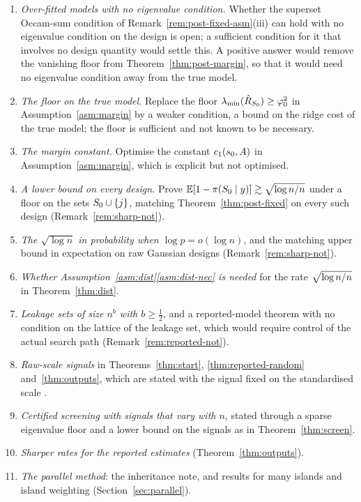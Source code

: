 \begin{enumerate}[leftmargin=1.5em]
  \item \emph{Over-fitted models with no eigenvalue condition.} Whether the superset Occam-sum condition of
    Remark~\ref{rem:post-fixed-asm}(iii) can hold with no eigenvalue condition on the design is open; a sufficient condition
    for it that involves no design quantity would settle this. A positive answer would remove the vanishing floor  from
    Theorem~\ref{thm:post-margin}, so that it would need no eigenvalue condition away from the true model.
  \item \emph{The floor on the true model.} Replace the floor $\lambda_{\min}(\hat R_{S_0})\ge\varphi_0^2$ in
    Assumption~\ref{asm:margin} by a weaker condition, a bound on the ridge cost of the true model; the floor is sufficient
    and not known to be necessary.
  \item \emph{The margin constant.} Optimise the constant $c_1(s_0,A)$ in Assumption~\ref{asm:margin}, which is explicit but
    not optimised.
  \item \emph{A lower bound on every design.} Prove $\operatorname{\mathbb{E}}[1-\pi(S_0\mid y)]\gtrsim\sqrt{\log n/n}$ under a floor on the sets
    $S_0\cup\{j\}$, matching Theorem~\ref{thm:post-fixed} on every such design (Remark~\ref{rem:sharp-not}).
  \item \emph{The $\sqrt{\log n}$ in probability when $\log p=o(\log n)$}, and the matching upper bound in expectation on
    raw Gaussian designs (Remark~\ref{rem:sharp-not}).
  \item \emph{Whether Assumption~\ref{asm:dist}\ref{asm:dist-nec} is needed} for the rate $\sqrt{\log n/n}$ in Theorem~\ref{thm:dist}.
  \item \emph{Leakage sets of size $n^b$ with $b\ge\tfrac12$}, and a reported-model theorem with no condition on the
    lattice of the leakage set, which would require control of the actual search path
    (Remark~\ref{rem:reported-not}).
  \item \emph{Raw-scale signals} in Theorems~\ref{thm:start}, \ref{thm:reported-random} and~\ref{thm:outputs}, which
    are stated with the signal fixed on the standardised scale .
  \item \emph{Certified screening with signals that vary with $n$}, stated through a sparse eigenvalue floor and a
    lower bound on the signals as in
    Theorem~\ref{thm:screen}.
  \item \emph{Sharper rates for the reported estimates} (Theorem~\ref{thm:outputs}).
  \item \emph{The parallel method}: the inheritance note, and results for many islands and island weighting
    (Section~\ref{sec:parallel}).
\end{enumerate}

